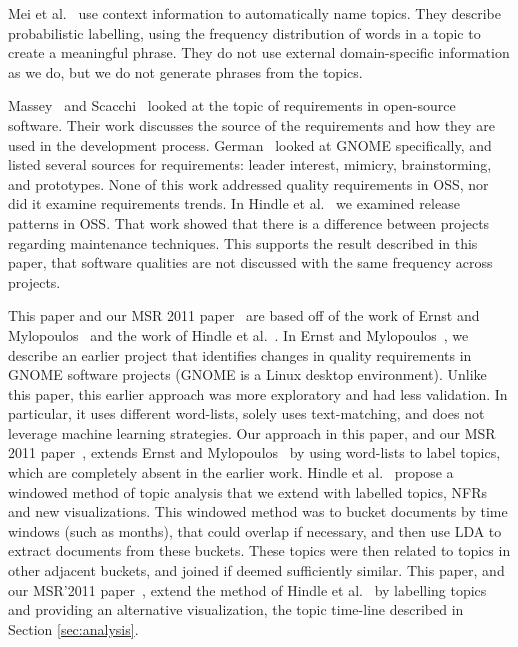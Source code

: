 \documentclass[smallextended]{svjour3}       %
\begin{document}
Mei et al.~\cite{Mei2007} use context information to automatically name topics. 
They describe probabilistic labelling, using the frequency distribution of words in a topic to create a meaningful phrase. 
They do not use external domain-specific information as we do, but we
do not generate phrases from the topics.


Massey~\cite{massey02icse} and Scacchi~\cite{scacchi05b} looked at the topic of requirements in open-source software. 
Their work discusses the source of the requirements and how they are used in the development process. 
 German~\cite{german03gnome} looked at GNOME specifically, and listed several sources for requirements: leader interest, mimicry, brainstorming, and prototypes. 
None of this work  addressed quality requirements in OSS, nor did it examine requirements trends.
In Hindle et al.~\cite{Hindle2007} we examined release patterns in OSS. That work showed that there is a difference between projects regarding maintenance
techniques. This supports the result described in this paper, that software qualities are not discussed with the same frequency across projects.



This paper and our MSR 2011 paper~\cite{msr2011} are based off of the
work of Ernst and Mylopoulos~\cite{ernst10refsq} and the work of Hindle et
al.~\cite{Hindle09ICSM}.
In Ernst and Mylopoulos~\cite{ernst10refsq}, we describe an earlier
project that identifies changes in quality requirements
in GNOME software projects (GNOME is a Linux desktop environment). Unlike this paper, this earlier approach was more exploratory and had
less validation. In particular, it  uses different word-lists, solely uses text-matching,
and does not leverage machine learning strategies.  
Our approach in this paper, and our
MSR 2011 paper~\cite{msr2011}, extends Ernst and Mylopoulos~\cite{ernst10refsq} by using 
word-lists to label topics, which are completely absent in the earlier work.
 Hindle et
al.~\cite{Hindle09ICSM}
 propose a windowed method of topic
analysis that we extend with labelled
topics, NFRs and new visualizations. This windowed method was
to bucket documents  by time windows (such as months), that could overlap if
necessary, and then use LDA to extract documents from these
buckets. These topics were then related to topics in other adjacent
buckets, and joined if deemed sufficiently similar. This paper, and our
MSR'2011 paper~\cite{msr2011}, extend the method of Hindle et
al.~\cite{Hindle09ICSM} by labelling topics
and providing an alternative visualization, the topic time-line
described in Section \ref{sec:analysis}.
\end{document}
